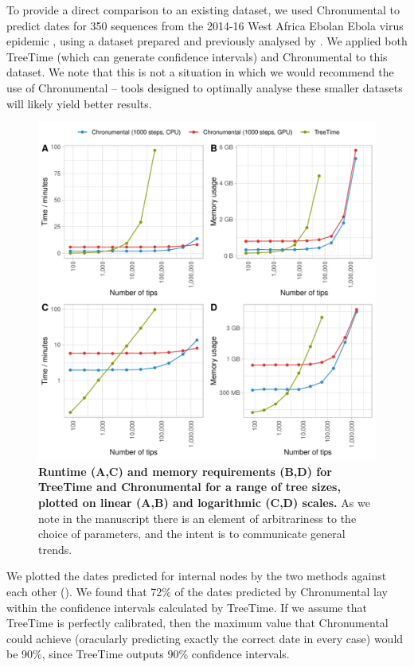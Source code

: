 To provide a direct comparison to an existing dataset, we used Chronumental to predict dates for 350 sequences from the 2014-16 West Africa Ebolan Ebola virus epidemic  \citep{Dudas2017-km}, using a dataset prepared and previously analysed by \citet{Sagulenko2018-kr}. We applied both TreeTime (which can generate confidence intervals) and Chronumental to this dataset. We note that this is not a situation in which we would recommend the use of Chronumental -- tools designed to optimally analyse these smaller datasets will likely yield better results.
\begin{figure}
\centering
\includegraphics[width=0.7\linewidth]{manuscript/Figures/performance.pdf}
\caption{\label{performance} \textbf{Runtime (A,C) and memory requirements (B,D) for TreeTime and Chronumental for a range of tree sizes, plotted on linear (A,B) and logarithmic (C,D) scales.} As we note in the manuscript there is an element of arbitrariness to the choice of parameters, and the intent is to communicate general trends. }

\end{figure}
We plotted the dates predicted for internal nodes by the two methods against each other (). We found that 72\% of the dates predicted by Chronumental lay within the confidence intervals calculated by TreeTime. If we assume that TreeTime is perfectly calibrated, then the maximum value that Chronumental could achieve (oracularly predicting exactly the correct date in every case) would be 90\%, since TreeTime outputs 90\% confidence intervals.


